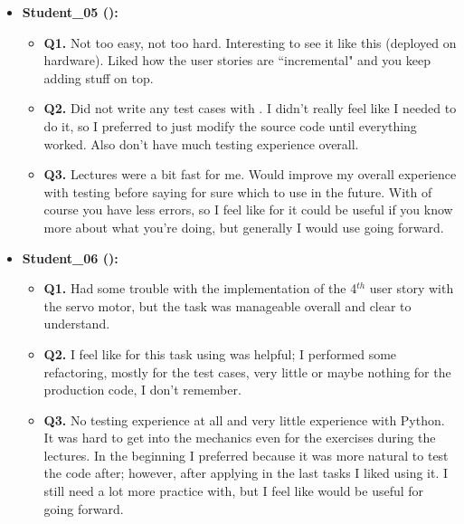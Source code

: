 \begin{itemize}
    \item \textbf{Student\_05 (\tdd):}
    \begin{itemize}
        \item \textbf{Q1.} Not too easy, not too hard. Interesting to see it like this (deployed on hardware). Liked how the user stories are ``incremental" and you keep adding stuff on top.
        \item \textbf{Q2.} Did not write any test cases with \notdd. I didn't really feel like I needed to do it, so I preferred to just modify the source code until everything worked. Also don't have much testing experience overall.
        \item \textbf{Q3.} Lectures were a bit fast for me. Would improve my overall experience with testing before saying for sure which to use in the future.  With \tdd of course you have less errors, so I feel like for \ess it could be useful if you know more about what you're doing, but generally I would use \notdd going forward.
    \end{itemize}

    \item \textbf{Student\_06 (\tdd):}
    \begin{itemize}
        \item \textbf{Q1.} Had some trouble with the implementation of the 4$^{th}$ user story with the servo motor, but the task was manageable overall and clear to understand.
        \item \textbf{Q2.} I feel like for this task using \tdd was helpful; I performed some refactoring, mostly for the test cases, very little or maybe nothing for the production code, I don't remember.
        \item \textbf{Q3.} No testing experience at all and very little experience with Python. It was hard to get into the mechanics even for the exercises during the lectures. In the beginning I preferred \notdd because it was more natural to test the code after; however, after applying \tdd in the last tasks I liked using it. I still need a lot more practice with, but I feel like \tdd would be useful for \ess going forward.
    \end{itemize}


\end{itemize}

